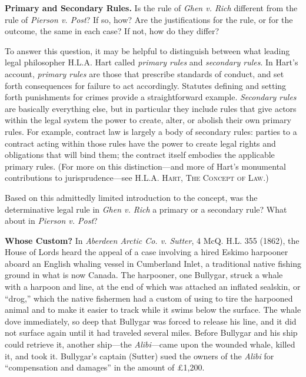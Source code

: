 

\item \textbf{Primary and Secondary Rules.} Is the rule of \textit{Ghen v. Rich}
different from the rule of \textit{Pierson v. Post}? If so, how? Are the
justifications for the rule, or for the outcome, the same in each case? If not,
how do they differ?

To answer this question, it may be helpful to distinguish between what leading
legal philosopher H.L.A. Hart called \textit{primary rules} and
\textit{secondary rules}. In Hart's account, \textit{primary rules} are those
that prescribe standards of conduct, and set forth consequences for failure to
act accordingly. Statutes defining and setting forth punishments for crimes
provide a straightforward example. \textit{Secondary rules} are basically
everything else, but in particular they include rules that give actors within
the legal system the power to create, alter, or abolish their own primary rules.
For example, contract law is largely a body of secondary rules: parties to a
contract acting within those rules have the power to create legal rights and
obligations that will bind them; the contract itself embodies the applicable
primary rules. (For more on this distinction---and more of Hart's monumental
contributions to jurisprudence---see \textsc{H.L.A. Hart, The Concept of Law}.)

Based on this admittedly limited introduction to the concept, was the
determinative legal rule in \textit{Ghen v. Rich} a primary or a secondary rule?
What about in \textit{Pierson v. Post}?

\item \textbf{Whose Custom?} In \textit{Aberdeen Arctic Co. v. Sutter}, 4 McQ.
H.L. 355 (1862), the House of Lords heard the appeal of a case involving a hired
Eskimo harpooner aboard an English whaling vessel in Cumberland Inlet, a
traditional native fishing ground in what is now Canada. The harpooner, one
Bullygar, struck a whale with a harpoon and line, at the end of which was
attached an inflated sealskin, or ``drog,'' which the native fishermen had a
custom of using to tire the harpooned animal and to make it easier to track
while it swims below the surface. The whale dove immediately, so deep that
Bullygar was forced to release his line, and it did not surface again until it
had traveled several miles. Before Bullygar and his ship could retrieve it,
another ship---the \textit{Alibi}---came upon the wounded whale, killed it, and
took it. Bullygar's captain (Sutter) sued the owners of the \textit{Alibi} for
``compensation and damages'' in the amount of {\pounds}1,200. 

